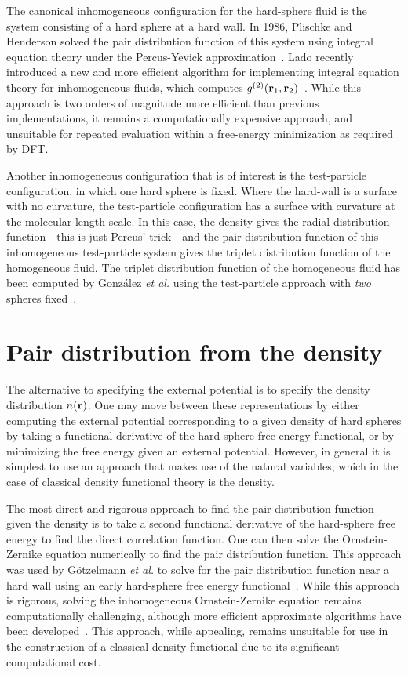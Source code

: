 The canonical inhomogeneous configuration for the hard-sphere fluid is
the system consisting of a hard sphere at a hard wall.  In 1986,
Plischke and Henderson solved the pair distribution function of this
system using integral equation theory under the Percus-Yevick
approximation~\cite{plischke1986pair}.
%
Lado recently introduced a new and more efficient algorithm for
implementing integral equation theory for inhomogeneous fluids, which
computes $g^{(2)}(\textbf{r}_1,\textbf{r}_2)$~\cite{lado2009efficient}.  While this
approach is two orders of magnitude more efficient than previous
implementations, it remains a computationally expensive approach, and
unsuitable for repeated evaluation within a free-energy minimization
as required by DFT.

Another inhomogeneous configuration that is of interest is the
test-particle configuration, in which one hard sphere is fixed.  Where
the hard-wall is a surface with no curvature, the test-particle
configuration has a surface with curvature at the molecular length
scale.  In this case, the density gives the radial distribution
function---this is just Percus' trick---and the pair distribution
function of this inhomogeneous test-particle system gives the triplet
distribution function of the homogeneous fluid.  The triplet
distribution function of the homogeneous fluid has been computed by
Gonz\'alez \emph{et al.} using the test-particle approach with
\emph{two} spheres fixed~\cite{gonzalez1999test}.

\section{Pair distribution from the density}\label{sec:gn}

The alternative to specifying the external potential is to specify the
density distribution $n(\textbf{r})$.  One may move between these
representations by either computing the external potential
corresponding to a given density of hard spheres by taking a
functional derivative of the hard-sphere free energy functional, or by
minimizing the free energy given an external potential.  However, in
general it is simplest to use an approach that makes use of the
natural variables, which in the case of classical density functional
theory is the density.

The most direct and rigorous approach to find the pair distribution
function given the density is to take a second functional derivative
of the hard-sphere free energy to find the direct correlation
function.  One can then solve the Ornstein-Zernike equation
numerically to find the pair distribution function.  This approach was
used by G{\"o}tzelmann \emph{et al.} to solve for the pair
distribution function near a hard wall using an early hard-sphere free
energy functional~\cite{gotzelmann1996structure}.  While this approach
is rigorous, solving the inhomogeneous Ornstein-Zernike equation
remains computationally challenging, although more efficient
approximate algorithms have been developed~\cite{paul2003variational}.
This approach, while appealing, remains unsuitable for use in the
construction of a classical density functional due to its significant
computational cost.

